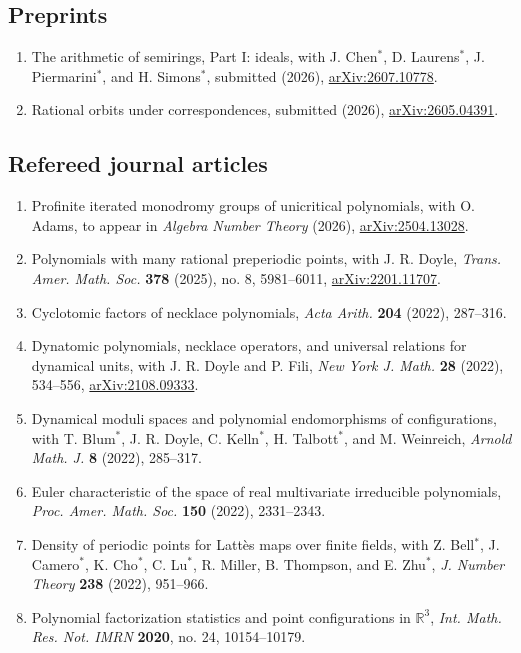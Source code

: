 \documentclass[11pt,letterpaper]{article}
\newcommand{\arxiv}[1]{\href{https://arxiv.org/abs/#1}{arXiv:#1}}
\newcommand{\ug}{$^{\ast}$}   %
\newcommand{\RR}{\mathbb{R}}
\begin{document}
\subsection{Preprints}
\begin{enumerate}
    \item The arithmetic of semirings, Part I: ideals, with J. Chen\ug, D. Laurens\ug, J. Piermarini\ug, and H. Simons\ug, submitted (2026), \arxiv{2607.10778}.
    \item Rational orbits under correspondences, submitted (2026), \arxiv{2605.04391}.
\end{enumerate}

\subsection{Refereed journal articles}
\begin{enumerate}[resume]
    \item Profinite iterated monodromy groups of unicritical polynomials, with O. Adams, to appear in \emph{Algebra Number Theory} (2026), \arxiv{2504.13028}.
    \item Polynomials with many rational preperiodic points, with J. R. Doyle, \emph{Trans. Amer. Math. Soc.} \textbf{378} (2025), no. 8, 5981--6011, \arxiv{2201.11707}.
    \item Cyclotomic factors of necklace polynomials, \emph{Acta Arith.} \textbf{204} (2022), 287--316.
    \item Dynatomic polynomials, necklace operators, and universal relations for dynamical units, with J. R. Doyle and P. Fili, \emph{New York J. Math.} \textbf{28} (2022), 534--556, \arxiv{2108.09333}.
    \item Dynamical moduli spaces and polynomial endomorphisms of configurations, with T. Blum\ug, J. R. Doyle, C. Kelln\ug, H. Talbott\ug, and M. Weinreich, \emph{Arnold Math. J.} \textbf{8} (2022), 285--317.
    \item Euler characteristic of the space of real multivariate irreducible polynomials, \emph{Proc. Amer. Math. Soc.} \textbf{150} (2022), 2331--2343.
    \item Density of periodic points for Latt\`es maps over finite fields, with Z. Bell\ug, J. Camero\ug, K. Cho\ug, C. Lu\ug, R. Miller, B. Thompson, and E. Zhu\ug, \emph{J. Number Theory} \textbf{238} (2022), 951--966.
    \item Polynomial factorization statistics and point configurations in $\RR^3$, \emph{Int. Math. Res. Not. IMRN} \textbf{2020}, no. 24, 10154--10179.

\end{enumerate}
\end{document}
